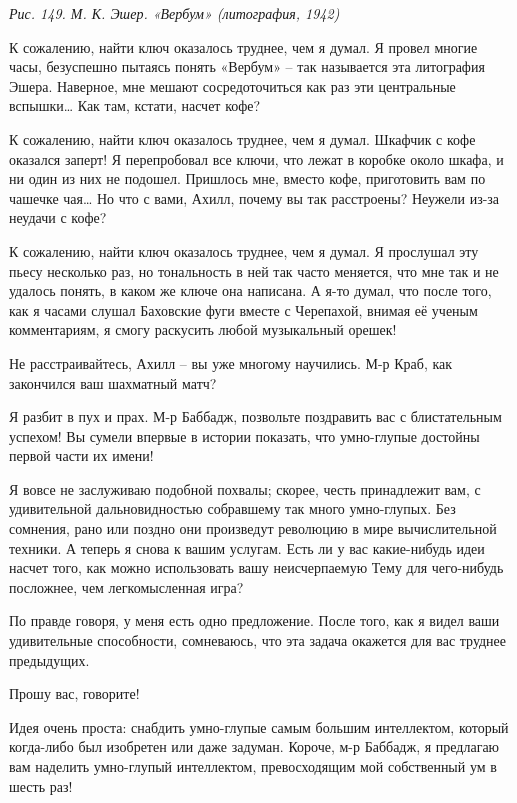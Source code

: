 \documentclass[../main.tex]{subfiles}
\begin{document}
\begin{dialogue}
\emph{Рис. 149. М. К. Эшер. «Вербум» (литография, 1942)}

 К сожалению, найти ключ оказалось труднее, чем я думал. Я провел многие часы, безуспешно пытаясь понять «Вербум» \--- так называется эта литография Эшера. Наверное, мне мешают сосредоточиться как раз эти центральные вспышки\ldots{} Как там, кстати, насчет кофе?

 К сожалению, найти ключ оказалось труднее, чем я думал. Шкафчик с кофе оказался заперт! Я перепробовал все ключи, что лежат в коробке около шкафа, и ни один из них не подошел. Пришлось мне, вместо кофе, приготовить вам по чашечке чая\ldots{} Но что с вами, Ахилл, почему вы так расстроены? Неужели из-за неудачи с кофе?

 К сожалению, найти ключ оказалось труднее, чем я думал. Я прослушал эту пьесу несколько раз, но тональность в ней так часто меняется, что мне так и не удалось понять, в каком же ключе она написана. А я-то думал, что после того, как я часами слушал Баховские фуги вместе с Черепахой, внимая её ученым комментариям, я смогу раскусить любой музыкальный орешек!

 Не расстраивайтесь, Ахилл \--- вы уже многому научились. М-р Краб, как закончился ваш шахматный матч?

 Я разбит в пух и прах. М-р Баббадж, позвольте поздравить вас с блистательным успехом! Вы сумели впервые в истории показать, что умно-глупые достойны первой части их имени!

 Я вовсе не заслуживаю подобной похвалы; скорее, честь принадлежит вам, с удивительной дальновидностью собравшему так много умно-глупых. Без сомнения, рано или поздно они произведут революцию в мире вычислительной техники. А теперь я снова к вашим услугам. Есть ли у вас какие-нибудь идеи насчет того, как можно использовать вашу неисчерпаемую Тему для чего-нибудь посложнее, чем легкомысленная игра?

 По правде говоря, у меня есть одно предложение. После того, как я видел ваши удивительные способности, сомневаюсь, что эта задача окажется для вас труднее предыдущих.

 Прошу вас, говорите!

 Идея очень проста: снабдить умно-глупые самым большим интеллектом, который когда-либо был изобретен или даже задуман. Короче, м-р Баббадж, я предлагаю вам наделить умно-глупый интеллектом, превосходящим мой собственный ум в шесть раз!


\end{dialogue}
\end{document}
